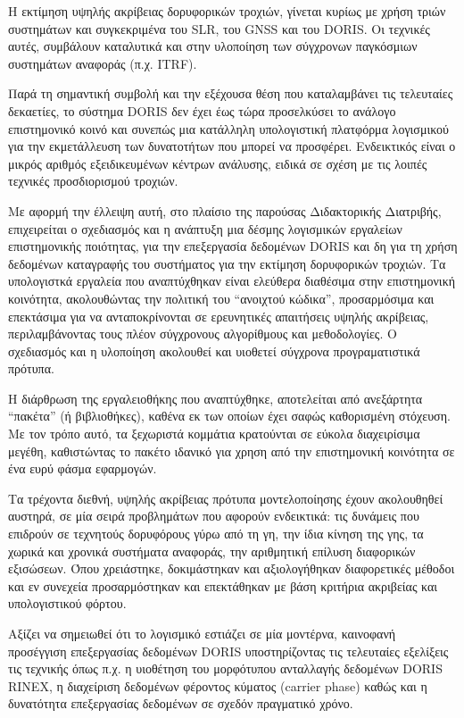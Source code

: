 Η εκτίμηση υψηλής ακρίβειας δορυφορικών τροχιών, γίνεται κυρίως με χρήση τριών συστημάτων
και συγκεκριμένα του \textlatin{SLR}, του \textlatin{GNSS} και του \textlatin{DORIS}. Οι τεχνικές αυτές, συμβάλουν
καταλυτικά και στην υλοποίηση των σύγχρονων παγκόσμιων συστημάτων αναφοράς (π.χ. \textlatin{ITRF}).

Παρά τη σημαντική συμβολή και την εξέχουσα θέση που καταλαμβάνει τις τελευταίες δεκαετίες,
το σύστημα \textlatin{DORIS} δεν έχει έως τώρα προσελκύσει το ανάλογο επιστημονικό κοινό και
συνεπώς μια κατάλληλη υπολογιστική πλατφόρμα λογισμικού για την εκμετάλλευση των δυνατοτήτων
που μπορεί να προσφέρει.
Ενδεικτικός είναι ο μικρός αριθμός εξειδικευμένων κέντρων ανάλυσης, ειδικά σε σχέση με τις
λοιπές τεχνικές προσδιορισμού τροχιών.

Με αφορμή την έλλειψη αυτή, στο πλαίσιο της παρούσας Διδακτορικής Διατριβής, επιχειρείται ο σχεδιασμός και
η ανάπτυξη μια δέσμης λογισμικών εργαλείων επιστημονικής ποιότητας, για την επεξεργασία
δεδομένων \textlatin{DORIS} και δη για τη χρήση δεδομένων καταγραφής του συστήματος για την
εκτίμηση δορυφορικών τροχιών. Τα υπολογιστκά εργαλεία που αναπτύχθηκαν είναι ελεύθερα διαθέσιμα στην επιστημονική
κοινότητα, ακολουθώντας την πολιτική του ``ανοιχτού κώδικα'', προσαρμόσιμα και επεκτάσιμα για να
ανταποκρίνονται σε ερευνητικές απαιτήσεις υψηλής ακρίβειας, περιλαμβάνοντας τους πλέον σύγχρονους αλγορίθμους
και μεθοδολογίες. Ο σχεδιασμός και η υλοποίηση ακολουθεί και υιοθετεί σύγχρονα
προγραματιστικά πρότυπα.

Η διάρθρωση της εργαλειοθήκης που αναπτύχθηκε, αποτελείται από ανεξάρτητα ``πακέτα'' (ή βιβλιοθήκες),
καθένα εκ των οποίων έχει σαφώς καθορισμένη στόχευση. Με τον τρόπο αυτό, τα ξεχωριστά κομμάτια
κρατούνται σε εύκολα διαχειρίσιμα μεγέθη, καθιστώντας το πακέτο ιδανικό για χρηση από την
επιστημονική κοινότητα σε ένα ευρύ φάσμα εφαρμογών.

Τα τρέχοντα διεθνή, υψηλής ακρίβειας πρότυπα μοντελοποίησης έχουν ακολουθηθεί αυστηρά, σε μία σειρά
προβλημάτων που αφορούν ενδεικτικά: τις δυνάμεις που επιδρούν σε τεχνητούς δορυφόρους γύρω από τη γη,
την ίδια κίνηση της γης, τα χωρικά και χρονικά συστήματα αναφοράς, την αριθμητική επίλυση
διαφορικών εξισώσεων. Όπου χρειάστηκε, δοκιμάστηκαν και αξιολογήθηκαν διαφορετικές μέθοδοι και
εν συνεχεία προσαρμόστηκαν και επεκτάθηκαν με βάση κριτήρια ακριβείας και υπολογιστικού φόρτου.

Αξίζει να σημειωθεί ότι το λογισμικό εστιάζει σε μία μοντέρνα, καινοφανή προσέγγιση επεξεργασίας 
δεδομένων \textlatin{DORIS} υποστηρίζοντας τις τελευταίες εξελίξεις τις τεχνικής όπως π.χ. η υιοθέτηση του 
μορφότυπου ανταλλαγής δεδομένων \textlatin{DORIS RINEX}, η διαχείριση δεδομένων φέροντος κύματος 
(\textlatin{carrier phase}) καθώς και η δυνατότητα επεξεργασίας δεδομένων σε σχεδόν πραγματικό χρόνο.

